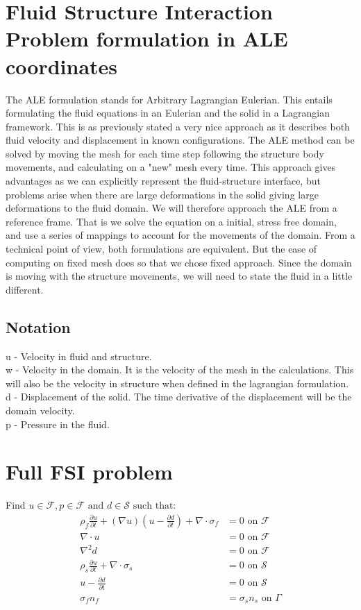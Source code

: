 

\section*{Fluid Structure Interaction Problem formulation in ALE coordinates}
The ALE formulation stands for Arbitrary Lagrangian Eulerian. This entails formulating the fluid equations in an Eulerian and the solid in a Lagrangian framework. This is as previously stated a very nice approach as it describes both fluid velocity and displacement in known configurations. The ALE method can be solved by moving the mesh for each time step following the structure body movements, and calculating on a "new" mesh every time. This approach gives advantages as we can explicitly represent the fluid-structure interface, but problems arise when there are large deformations in the solid giving large deformations to the fluid domain. We will therefore approach the ALE from a reference frame. That is we solve the equation on a initial, stress free domain, and use a series of mappings to account for the movements of the domain. From a technical point of view, both formulations are equivalent. But the ease of computing on fixed mesh does so that we chose fixed approach. \newline
Since the domain is moving with the structure movements, we will need to state the fluid in a little different.        

\subsection*{Notation}
u - Velocity in fluid and structure. \\
w - Velocity in the domain. It is the velocity of the mesh in the calculations. This will also be the velocity in structure when defined in the lagrangian formulation. \\
d - Displacement of the solid. The time derivative of the displacement will be the domain velocity. \\
p - Pressure in the fluid. 

\section*{Full FSI problem}
Find $u \in \mathcal{F} , p \in \mathcal{F} \text{  and  } d \in \mathcal{S} \text{  such that}:$ 
\begin{align}
\rho_f  \frac{\partial u}{\partial t} + (\nabla u)(u-\frac{\partial d}{\partial t})  + \nabla \cdot \sigma_f  &= 0 \text{  on  } \mathcal{F } \\
\nabla \cdot u  &= 0 \text{  on  } \mathcal{F}   \\
\nabla^2 d &= 0  \text{  on  } \mathcal{F}\\
\rho_s \frac{\partial u}{\partial t} + \nabla \cdot \sigma_s &=0  \text{  on  } \mathcal{ S }\\
u- \frac{\partial d}{\partial t}  &= 0  \text{  on  } \mathcal{ S }\\
\sigma_f  n_f &= \sigma_s  n_s \text{  on  } \Gamma
\end{align}





